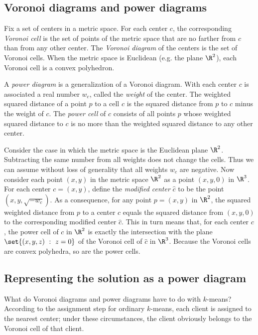 \subsection{Voronoi diagrams and power diagrams}

Fix a set of centers in a metric space.  For each center $c$, the
corresponding {\em Voronoi cell} is the set of points of the metric
space that are no farther from $c$ than from any other center.
The {\em Voronoi diagram} of the centers is the set of Voronoi cells.
When the metric space is Euclidean (e.g. the plane $\R^2$), each
Voronoi cell is a convex polyhedron.  

A {\em power diagram} is a generalization of a Voronoi diagram.  With
each center $c$ is associated a real number $w_c$, called the {\em weight} of
the center.  The weighted squared distance of a point $p$ to a cell
$c$ is the squared distance from $p$ to $c$ minus the weight of $c$.  
 The {\em power cell} of $c$ consists of all points $p$ whose weighted squared
 distance to $c$ is no more than the weighted squared distance to any
 other center.

 Consider the case in which the metric space is the Euclidean plane
 $\R^2$.  Subtracting the same number from all weights does not change
 the cells.  Thus we can assume without loss of generality that all
 weights $w_c$ are negative.  Now consider each point $(x,y)$ in the
 metric space $\R^2$ as a point $(x,y,0)$ in $\R^3$.  For each center
 $c=(x,y)$, define the {\em modified center} $\hat c$ to be the point
 $(x,y, \sqrt{-w_c})$.  As a consequence, for any point $p=(x,y)$ in
 $\R^2$, the squared weighted distance from $p$ to a center $c$ equals
 the squared distance from $(x,y,0)$ to the corresponding modified
 center $\hat c$.  This in turn means that, for each center $c$, the
 power cell of $c$ in $\R^2$ is exactly the intersection with the
 plane $\set{(x,y,z)\ :\ z=0}$ of the Voronoi cell of $\hat c$ in
 $\R^3$.  Because the Voronoi cells are convex polyhedra, so are the
 power cells.

\subsection{Representing the solution as a power diagram}

What do Voronoi diagrams and power diagrams have to do with $k$-means?
According to the assignment step for ordinary $k$-means, each client
is assigned to the nearest center; under these circumstances, the
client obviously belongs to the Voronoi cell of that client.  

